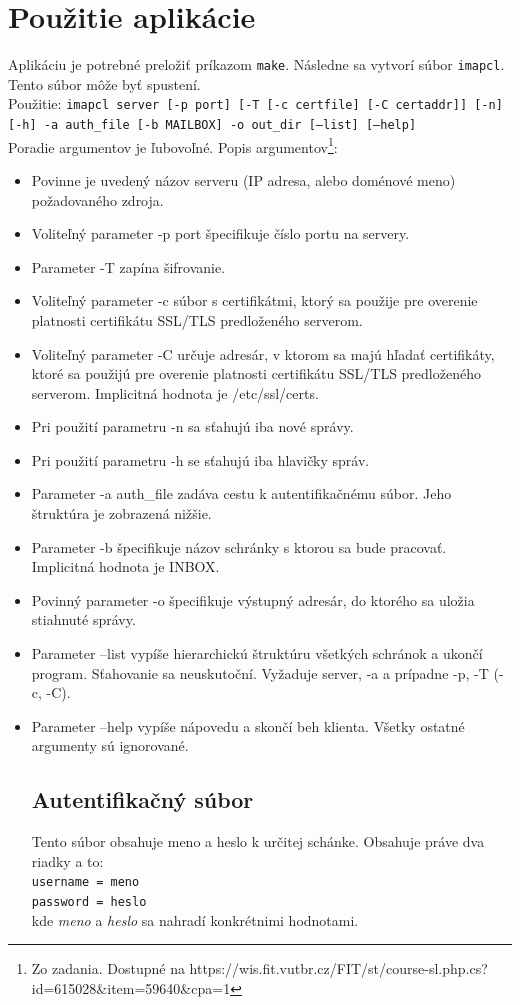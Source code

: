 \documentclass{article}
\begin{document}
\section{Použitie aplikácie}
Aplikáciu je potrebné preložiť príkazom \texttt{make}. Následne sa vytvorí súbor \texttt{imapcl}. Tento súbor môže byť spustení.\\
Použitie: \texttt{imapcl server [-p port] [-T [-c certfile] [-C certaddr]] [-n] [-h] -a auth\_file [-b MAILBOX] -o out\_dir [--list] [--help]}\\

Poradie argumentov je ľubovoľné. Popis argumentov\footnote{Zo zadania. Dostupné na https://wis.fit.vutbr.cz/FIT/st/course-sl.php.cs?id=615028\&item=59640\&cpa=1}:\\

\begin{itemize}
\item Povinne je uvedený názov serveru (IP adresa, alebo doménové meno) požadovaného zdroja.
\item    Voliteľný parameter -p port špecifikuje číslo portu na servery.
\item    Parameter -T zapína šifrovanie.
\item    Voliteľný parameter -c súbor s certifikátmi, ktorý sa použije pre overenie platnosti certifikátu SSL/TLS predloženého serverom.
\item    Voliteľný parameter -C určuje adresár, v ktorom sa majú hľadať certifikáty, ktoré sa použijú pre overenie platnosti certifikátu SSL/TLS predloženého serverom. Implicitná hodnota je /etc/ssl/certs.
\item    Pri použití parametru -n sa sťahujú iba nové správy.
\item    Pri použití parametru -h se sťahujú iba hlavičky správ.
\item    Parameter -a auth\_file zadáva cestu k autentifikačnému súbor. Jeho štruktúra je zobrazená nižšie.
\item    Parameter -b špecifikuje názov schránky s ktorou sa bude pracovať. Implicitná hodnota je INBOX.
\item    Povinný parameter -o špecifikuje výstupný adresár, do ktorého sa uložia stiahnuté správy.
\item   Parameter --list vypíše hierarchickú štruktúru všetkých schránok a ukončí program. Sťahovanie sa
    neuskutoční. Vyžaduje server, -a a prípadne -p, -T (-c, -C).
\item   Parameter --help vypíše nápovedu a skončí beh klienta. Všetky ostatné argumenty sú ignorované.

\subsection{Autentifikačný súbor}
Tento súbor obsahuje meno a heslo k určitej schánke. Obsahuje práve dva riadky a to:\\
\texttt{username = meno\\
password = heslo}\\
kde \textit{meno} a \textit{heslo} sa nahradí konkrétnimi hodnotami.

\end{itemize}
\end{document}
